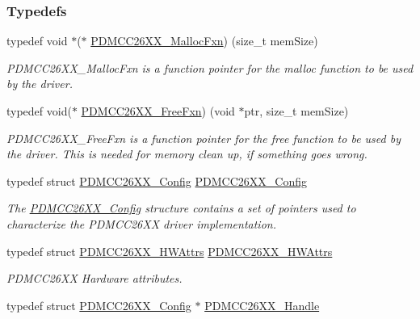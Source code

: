 \subsubsection*{Typedefs}
\begin{DoxyCompactItemize}
\item 
typedef void $\ast$($\ast$ \hyperlink{_p_d_m_c_c26_x_x_8h_acce02978ce536ea3b98a673587a6e75c}{P\+D\+M\+C\+C26\+X\+X\+\_\+\+Malloc\+Fxn}) (size\+\_\+t mem\+Size)
\begin{DoxyCompactList}\small\item\em P\+D\+M\+C\+C26\+X\+X\+\_\+\+Malloc\+Fxn is a function pointer for the malloc function to be used by the driver. \end{DoxyCompactList}\item 
typedef void($\ast$ \hyperlink{_p_d_m_c_c26_x_x_8h_af95e29fbea1fadfb011e4ceaa36f1ab0}{P\+D\+M\+C\+C26\+X\+X\+\_\+\+Free\+Fxn}) (void $\ast$ptr, size\+\_\+t mem\+Size)
\begin{DoxyCompactList}\small\item\em P\+D\+M\+C\+C26\+X\+X\+\_\+\+Free\+Fxn is a function pointer for the free function to be used by the driver. This is needed for memory clean up, if something goes wrong. \end{DoxyCompactList}\item 
typedef struct \hyperlink{struct_p_d_m_c_c26_x_x___config}{P\+D\+M\+C\+C26\+X\+X\+\_\+\+Config} \hyperlink{_p_d_m_c_c26_x_x_8h_acfb1c3839ec53d02703f67f884760119}{P\+D\+M\+C\+C26\+X\+X\+\_\+\+Config}
\begin{DoxyCompactList}\small\item\em The \hyperlink{struct_p_d_m_c_c26_x_x___config}{P\+D\+M\+C\+C26\+X\+X\+\_\+\+Config} structure contains a set of pointers used to characterize the P\+D\+M\+C\+C26\+X\+X driver implementation. \end{DoxyCompactList}\item 
typedef struct \hyperlink{struct_p_d_m_c_c26_x_x___h_w_attrs}{P\+D\+M\+C\+C26\+X\+X\+\_\+\+H\+W\+Attrs} \hyperlink{_p_d_m_c_c26_x_x_8h_a0188ef7df22961ba87b588d2913e793e}{P\+D\+M\+C\+C26\+X\+X\+\_\+\+H\+W\+Attrs}
\begin{DoxyCompactList}\small\item\em P\+D\+M\+C\+C26\+X\+X Hardware attributes. \end{DoxyCompactList}\item 
typedef struct \hyperlink{struct_p_d_m_c_c26_x_x___config}{P\+D\+M\+C\+C26\+X\+X\+\_\+\+Config} $\ast$ \hyperlink{_p_d_m_c_c26_x_x_8h_ae5b9ecc0f8eb494e162b4a0a49c0636a}{P\+D\+M\+C\+C26\+X\+X\+\_\+\+Handle}

\end{DoxyCompactItemize}
